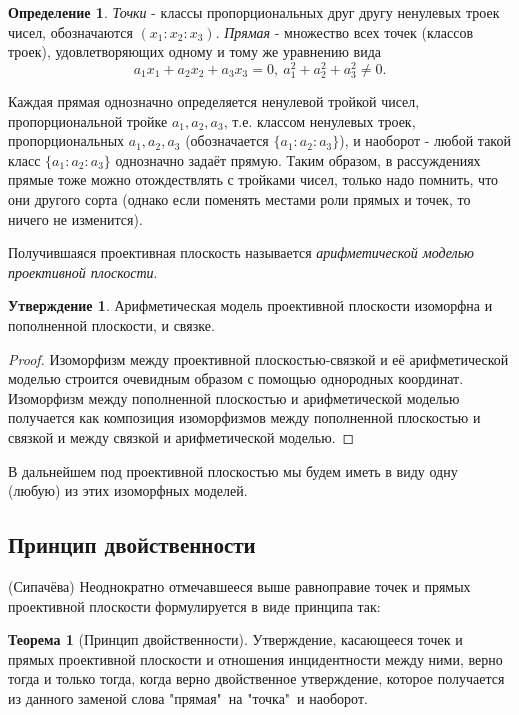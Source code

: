 \documentclass[a4paper, 12pt]{article}
\theoremstyle{definition}
\newtheorem*{definition}{Определение}
\newtheorem*{theorem}{Теорема}
\newtheorem*{subtheorem}{Утверждение}
\begin{document}
\begin{definition}
    \textit{Точки} - классы пропорциональных друг другу ненулевых троек чисел, обозначаются $(x_1:x_2:x_3)$.
    \textit{Прямая} - множество всех точек (классов троек), удовлетворяющих одному и тому же уравнению вида \[ a_1x_1 + a_2x_2 + a_3x_3 = 0, \ a_1^2 + a_2^2 + a_3^2 \neq 0. \]
\end{definition}

Каждая прямая однозначно определяется ненулевой тройкой чисел, пропорциональной тройке $a_1, a_2, a_3$, т.е. классом ненулевых троек, пропорциональных $a_1, a_2, a_3$ (обозначается $\{a_1:a_2:a_3\}$), и наоборот - любой такой класс $\{a_1:a_2:a_3\}$ однозначно задаёт прямую. Таким образом, в рассуждениях прямые тоже можно отождествлять с тройками чисел, только надо помнить, что они другого сорта (однако если поменять местами роли прямых и точек, то ничего не изменится).

Получившаяся проективная плоскость называется \textit{арифметической моделью проективной плоскости}.

\begin{subtheorem}
    Арифметическая модель проективной плоскости изоморфна и пополненной плоскости, и связке.
\end{subtheorem}
\begin{proof}
    Изоморфизм между проективной плоскостью-связкой и её арифметической моделью строится очевидным образом с помощью однородных координат. Изоморфизм между пополненной плоскостью и арифметической моделью получается как композиция изоморфизмов между пополненной плоскостью и связкой и между связкой и арифметической моделью.
\end{proof}

В дальнейшем под проективной плоскостью мы будем иметь в виду одну (любую) из этих изоморфных моделей.


\subsection{Принцип двойственности}
(Сипачёва) Неоднократно отмечавшееся выше равноправие точек и прямых проективной плоскости формулируется в виде принципа так:

\begin{theorem}[Принцип двойственности]
    Утверждение, касающееся точек и прямых проективной плоскости и отношения инцидентности между ними, верно тогда и только тогда, когда верно двойственное утверждение, которое получается из данного заменой слова "прямая"\ на "точка"\ и наоборот.
\end{theorem}
\end{document}
